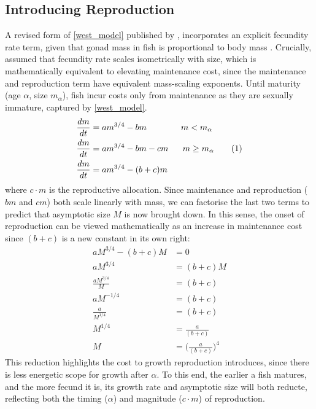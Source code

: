 \documentclass[a4paper]{article} %
\newcommand\numberthis{\addtocounter{equation}{1}\tag{\theequation}}
\begin{document}
\subsection{Introducing Reproduction}
A revised form of \cref{west_model} published by \textcite{Charnov2001}, incorporates an explicit fecundity rate term, given that gonad mass in fish is proportional to body mass \autocite{Charnov2001, Roff1983, peters1983, kozlowski1996}. Crucially, \textcite{Charnov2001} assumed that fecundity rate scales isometrically with size, which is mathematically equivalent to elevating maintenance cost, since the maintenance and reproduction term have equivalent mass-scaling exponents. Until maturity (age $\alpha$, size $m_{\alpha}$), fish incur costs only from maintenance as they are sexually immature, captured by \cref{west_model}. 
\begin{align*}
    \frac{dm}{dt} &= am^{3/4} - bm \ \ \ \ \ \ \ \ \ \ \ \ m < m_{\alpha} \\
    \frac{dm}{dt} &= am^{3/4} - bm - cm \ \ \ \ \ m \geq m_{\alpha} \numberthis \label{charnov2001} \\
    \frac{dm}{dt} &= am^{3/4} - (b+c)m
\end{align*}
where $c \cdot m$ is the reproductive allocation. Since maintenance and reproduction ($bm$ and $cm$) both scale linearly with mass, we can factorise the last two terms to predict that asymptotic size $M$ is now brought down. In this sense, the onset of reproduction can be viewed mathematically as an increase in maintenance cost since $(b+c)$ is a new constant in its own right:
\begin{align*}
    aM^{3/4} - (b+c)M &= 0 \\
    aM^{3/4} &= (b+c)M \\
    \frac{aM^{3/4}}{M} &= (b+c) \\
    aM^{-1/4} &= (b+c) \\
    \frac{a}{M^{1/4}} &= (b+c) \\
    M^{1/4} &= \frac{a}{(b+c)} \\
    M &= \Bigg(\frac{a}{(b+c)}\Bigg)^4
\end{align*}
This reduction highlights the cost to growth reproduction introduces, since there is less energetic scope for growth after $\alpha$. To this end, the earlier a fish matures, and the more fecund it is, its growth rate and asymptotic size will both reducte, reflecting both the timing ($\alpha$) and magnitude ($c\cdot{m}$) of reproduction.
\end{document}
